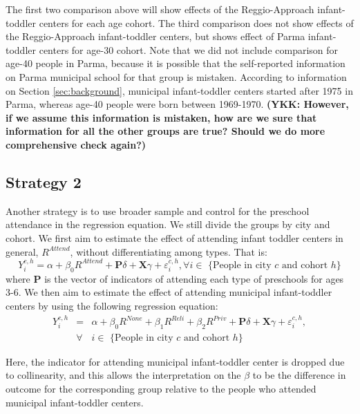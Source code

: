 The first two comparison above will show effects of the Reggio-Approach infant-toddler centers for each age cohort. The third comparison does not show effects of the Reggio-Approach infant-toddler centers, but shows effect of Parma infant-toddler centers for age-30 cohort. Note that we did not include comparison for age-40 people in Parma, because it is possible that the self-reported information on Parma municipal school for that group is mistaken. According to information on Section \ref{sec:background}, municipal infant-toddler centers started after 1975 in Parma, whereas age-40 people were born between 1969-1970. \textbf{(YKK: However, if we assume this information is mistaken, how are we sure that information for all the other groups are true? Should we do more comprehensive check again?)}

\subsection{Strategy 2}
Another strategy is to use broader sample and control for the preschool attendance in the regression equation. We still divide the groups by city and cohort. We first aim to estimate the effect of attending infant toddler centers in general, $R^{Attend}$, without differentiating among types. That is:
\begin{equation}
Y_{i}^{c,h} = \alpha + \beta_{0}R^{Attend} + \mathbf{P}\delta + \mathbf{X}\gamma + \varepsilon_{i}^{c,h}, \forall i \in \text{ \{People in city $c$ and cohort $h$\}}
\end{equation}
where $\mathbf{P}$ is the vector of indicators of attending each type of preschools for ages 3-6. We then aim to estimate the effect of attending municipal infant-toddler centers by using the following regression equation:
\begin{eqnarray}
Y_{i}^{c,h} & = & \alpha + \beta_{0}R^{None} + \beta_{1}R^{Reli} + \beta_{2}R^{Priv} + \mathbf{P}\delta +  \mathbf{X}\gamma + \varepsilon_{i}^{c,h}, \\ \nonumber
& \forall & i \in \text{ \{People in city $c$ and cohort $h$\}}
\end{eqnarray}

Here, the indicator for attending municipal infant-toddler center is dropped due to collinearity, and this allows the interpretation on the $\beta$ to be the difference in outcome for the corresponding group relative to the people who attended municipal infant-toddler centers. 

\clearpage

